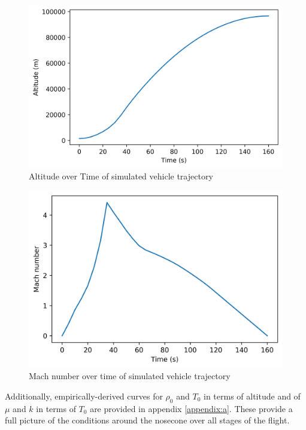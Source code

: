 \documentclass[twocolumn]{article}
\begin{document}
            \begin{subfigures}
                \begin{figure}[h]
                    \includegraphics[width=\linewidth]{altitude.png}
                    \caption{Altitude over Time of simulated vehicle trajectory}
                    \label{fig:alt}
                \end{figure}
                \begin{figure}[h]
                    \includegraphics[width=\linewidth]{machs.png}
                    \caption{Mach number over time of simulated vehicle trajectory}
                    \label{fig:mach}
                \end{figure}
            \end{subfigures}

            Additionally, empirically-derived curves
            for $\rho_0$ and  $T_0$ in 
            terms of altitude and of $\mu$ and $k$ in terms of $T_0$ are 
            provided in appendix \ref{appendix:a}. These provide a full picture
            of the conditions around the nosecone over all stages of the flight.
\end{document}
